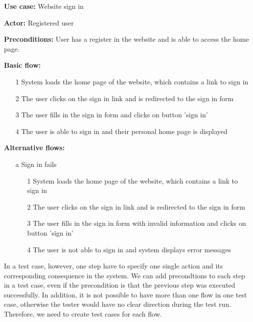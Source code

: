 \textbf{Use case:} Website sign in

\textbf{Actor:} Registered user

\textbf{Preconditions:} User has a register in the website and is able to access the home page. 

\textbf{Basic flow:}

\begin{itemize}

\item[1] System loads the home page of the website, which contains a link to sign in

\item[2] The user clicks on the sign in link and is redirected to the sign in form

\item[3] The user fills in the sign in form and clicks on button 'sign in'

\item[4] The user is able to sign in and their personal home page is displayed
\end{itemize}

\textbf{Alternative flows:}

\begin{itemize}

\item[a] Sign in fails

\begin{itemize}

\item[1] System loads the home page of the website, which contains a link to sign in

\item[2] The user clicks on the sign in link and is redirected to the sign in form

\item[3] The user fills in the sign in form with invalid information and clicks on button 'sign in'

\item[4] The user is not able to sign in and system displays error messages
\end{itemize} 
\end{itemize}

In a test case, however, one step have to specify one single action and its corresponding consequence in the system. We can add precondtions to each step in a test case, even if the precondition is that the previous step was executed successfully. In addition, it is not possible to have more than one flow in one test case, otherwise the tester would have no clear direction during the test run. Therefore, we need to create test cases for each flow.

